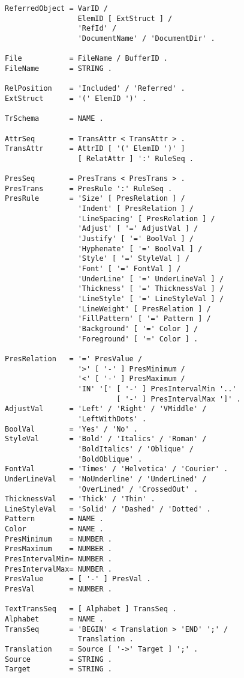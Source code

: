 \begin{verbatim}
ReferredObject = VarID /
                 ElemID [ ExtStruct ] /
                 'RefId' /
                 'DocumentName' / 'DocumentDir' .                

File           = FileName / BufferID .
FileName       = STRING .

RelPosition    = 'Included' / 'Referred' .
ExtStruct      = '(' ElemID ')' .

TrSchema       = NAME .

AttrSeq        = TransAttr < TransAttr > .
TransAttr      = AttrID [ '(' ElemID ')' ] 
                 [ RelatAttr ] ':' RuleSeq .

PresSeq        = PresTrans < PresTrans > .
PresTrans      = PresRule ':' RuleSeq .
PresRule       = 'Size' [ PresRelation ] /
                 'Indent' [ PresRelation ] /
                 'LineSpacing' [ PresRelation ] /
                 'Adjust' [ '=' AdjustVal ] /
                 'Justify' [ '=' BoolVal ] /
                 'Hyphenate' [ '=' BoolVal ] /
                 'Style' [ '=' StyleVal ] /
                 'Font' [ '=' FontVal ] /
                 'UnderLine' [ '=' UnderLineVal ] /
                 'Thickness' [ '=' ThicknessVal ] /
                 'LineStyle' [ '=' LineStyleVal ] /
                 'LineWeight' [ PresRelation ] /
                 'FillPattern' [ '=' Pattern ] /
                 'Background' [ '=' Color ] /
                 'Foreground' [ '=' Color ] .

PresRelation   = '=' PresValue /
                 '>' [ '-' ] PresMinimum /
                 '<' [ '-' ] PresMaximum /
                 'IN' '[' [ '-' ] PresIntervalMin '..'
                          [ '-' ] PresIntervalMax ']' .
AdjustVal      = 'Left' / 'Right' / 'VMiddle' / 
                 'LeftWithDots' .
BoolVal        = 'Yes' / 'No' .
StyleVal       = 'Bold' / 'Italics' / 'Roman' /
                 'BoldItalics' / 'Oblique' /
                 'BoldOblique' .
FontVal        = 'Times' / 'Helvetica' / 'Courier' .
UnderLineVal   = 'NoUnderline' / 'UnderLined' /
                 'OverLined' / 'CrossedOut' .
ThicknessVal   = 'Thick' / 'Thin' .
LineStyleVal   = 'Solid' / 'Dashed' / 'Dotted' .
Pattern        = NAME .
Color          = NAME .
PresMinimum    = NUMBER .
PresMaximum    = NUMBER .
PresIntervalMin= NUMBER .
PresIntervalMax= NUMBER .
PresValue      = [ '-' ] PresVal .
PresVal        = NUMBER .

TextTransSeq   = [ Alphabet ] TransSeq .
Alphabet       = NAME .
TransSeq       = 'BEGIN' < Translation > 'END' ';' /
                 Translation .
Translation    = Source [ '->' Target ] ';' .
Source         = STRING .
Target         = STRING .
\end{verbatim}

